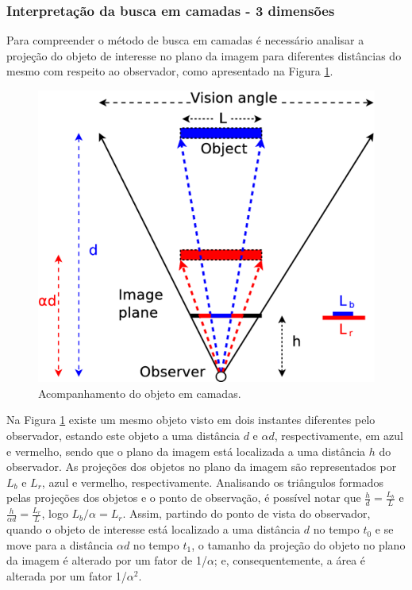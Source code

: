 

\subsubsection{Interpretação da busca em camadas - 3 dimensões}

Para compreender o método de busca em camadas é necessário analisar a projeção do objeto de interesse
no plano da imagem para diferentes distâncias do mesmo com respeito ao observador, 
como apresentado na Figura \ref{fig:multiscale3d}.
\begin{figure}[H]
\centering
  \includegraphics[width=.7\columnwidth]{images/Diagrama3.eps}
  \caption{ Acompanhamento do objeto em camadas.}
  \label{fig:multiscale3d}
\end{figure}
Na Figura \ref{fig:multiscale3d} existe um mesmo objeto visto em dois instantes diferentes pelo observador,
estando este objeto a uma distância $d$ e $\alpha d$, respectivamente, em azul e vermelho, sendo que
o plano da imagem está localizada a uma distância $h$ do observador. As projeções dos objetos no plano da imagem
 são representados por $L_b$ e $L_r$, azul e vermelho, respectivamente. 
 Analisando os triângulos formados pelas projeções dos objetos e o ponto de observação, 
 é possível notar que $\frac{h}{d}=\frac{L_b}{L}$ e $\frac{h}{\alpha d}=\frac{L_r}{L}$, logo 
$L_b/\alpha= L_r$. 
Assim, partindo do ponto de vista do observador, quando o objeto de interesse está localizado a uma distância $d$ no tempo
$t_0$ e se move para a distância $\alpha d$ no tempo $t_1$, o tamanho da projeção do objeto no plano da imagem 
é alterado por um fator de 1/$\alpha$; e, consequentemente, a área é alterada por um fator 1/$\alpha^2$.

